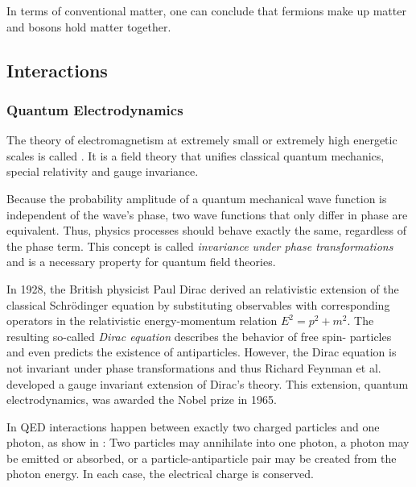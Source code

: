 In terms of conventional matter, one can conclude that fermions make up matter and bosons hold matter together.

\subsection{Interactions}
\subsubsection{Quantum Electrodynamics}
The theory of electromagnetism at extremely small or extremely high energetic scales is called . It is a field theory that unifies classical quantum mechanics, special relativity and gauge invariance.

Because the probability amplitude of a quantum mechanical wave function is independent of the wave's phase, two wave functions that only differ in phase are equivalent. Thus, physics processes should behave exactly the same, regardless of the phase term. This concept is called \emph{invariance under phase transformations} and is a necessary property for quantum field theories.

In 1928, the British physicist Paul Dirac derived an relativistic extension of the classical Schrödinger equation by substituting observables with corresponding operators in the relativistic energy-momentum relation $E^2 = p^2 + m^2$. The resulting so-called \emph{Dirac equation} describes the behavior of free spin- particles and even predicts the existence of antiparticles.
However, the Dirac equation is not invariant under phase transformations and thus Richard Feynman et al. developed a gauge invariant extension of Dirac's theory. This extension, quantum electrodynamics, was awarded the Nobel prize in 1965\cite{NobelMedia:NobelPrize1965}.

In \ac{QED} interactions happen between exactly two charged particles and one photon, as show in : Two particles may annihilate into one photon, a photon may be emitted or absorbed, or a particle-antiparticle pair may be created from the photon energy. In each case, the electrical charge is conserved.


